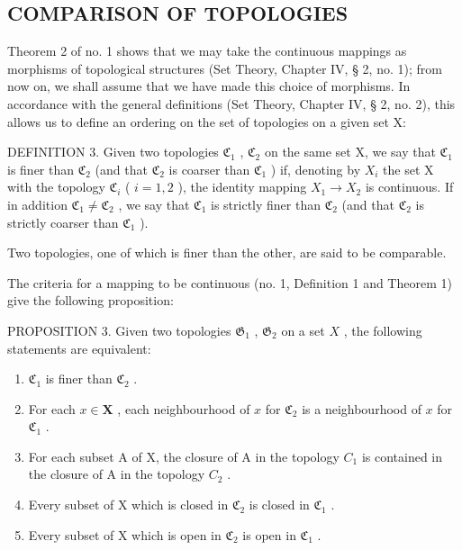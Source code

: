 \subsection{COMPARISON OF TOPOLOGIES}

Theorem 2 of no. 1 shows that we may take the continuous mappings as morphisms of topological structures (Set Theory, Chapter IV, § 2, no. 1); from now on, we shall assume that we have made this choice of morphisms. In accordance with the general definitions (Set Theory, Chapter IV, § 2, no. 2), this allows us to define an ordering on the set of topologies on a given set X:

DEFINITION 3. Given two topologies \(\mathfrak{C}_1\) , \(\mathfrak{C}_2\) on the same set X, we say that \(\mathfrak{C}_1\) is finer than \(\mathfrak{C}_2\) (and that \(\mathfrak{C}_2\) is coarser than \(\mathfrak{C}_1\) ) if, denoting by \(X_i\) the set X with the topology \(\mathfrak{C}_i\) ( \(i = 1, 2\) ), the identity mapping \(X_1 \to X_2\) is continuous. If in addition \(\mathfrak{C}_1 \neq \mathfrak{C}_2\) , we say that \(\mathfrak{C}_1\) is strictly finer than \(\mathfrak{C}_2\) (and that \(\mathfrak{C}_2\) is strictly coarser than \(\mathfrak{C}_1\) ).

Two topologies, one of which is finer than the other, are said to be comparable.

The criteria for a mapping to be continuous (no. 1, Definition 1 and Theorem 1) give the following proposition:

PROPOSITION 3. Given two topologies \(\mathfrak{G}_1\) , \(\mathfrak{G}_2\) on a set \(X\) , the following statements are equivalent:

\begin{enumerate}
\def\labelenumi{\alph{enumi})}
\item
  \(\mathfrak{C}_1\) is finer than \(\mathfrak{C}_2\) .
\item
  For each \(x \in \mathbf{X}\) , each neighbourhood of \(x\) for \(\mathfrak{C}_2\) is a neighbourhood of \(x\) for \(\mathfrak{C}_1\) .
\item
  For each subset A of X, the closure of A in the topology \(C_{1}\) is contained in the closure of A in the topology \(C_{2}\) .
\item
  Every subset of X which is closed in \(\mathfrak{C}_{2}\) is closed in \(\mathfrak{C}_{1}\) .
\item
  Every subset of X which is open in \(\mathfrak{C}_{2}\) is open in \(\mathfrak{C}_{1}\) .
\end{enumerate}

